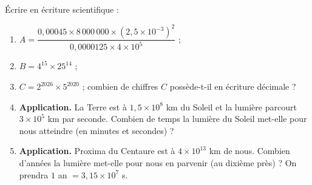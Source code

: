 
Écrire en écriture scientifique :
\begin{enumerate}
  \item $A=\dfrac{0{,}00045\times8\,000\,000\times(2{,}5\times10^{-3})^2}{0{,}0000125\times4\times10^{5}}$ ;
  \item $B=4^{15}\times25^{14}$ ;
  \item $C=2^{2026}\times5^{2020}$ ; combien de chiffres $C$ possède-t-il en écriture décimale ?
  \item \textbf{Application.} La Terre est à $1{,}5\times10^{8}$ km du Soleil et la lumière parcourt $3\times10^{5}$ km par seconde. Combien de temps la lumière du Soleil met-elle pour nous atteindre (en minutes et secondes) ?
  \item \textbf{Application.} Proxima du Centaure est à $4\times10^{13}$ km de nous. Combien d'années la lumière met-elle pour nous en parvenir (au dixième près) ? On prendra $1$ an $=3{,}15\times10^{7}$ s.
\end{enumerate}

